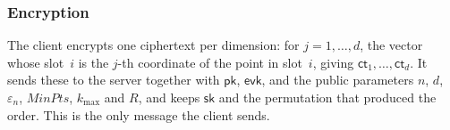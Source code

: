 

\subsubsection{Encryption}
The client encrypts one ciphertext per dimension: for
$j = 1, \dots, d$, the vector whose slot~$i$ is the $j$-th coordinate of
the point in slot~$i$, giving $\mathsf{ct}_1, \dots, \mathsf{ct}_d$. It
sends these to the server together with $\mathsf{pk}$, $\mathsf{evk}$,
and the public parameters $n$, $d$, $\varepsilon_n$, $\mathit{MinPts}$,
$k_{\max}$ and $R$, and keeps $\mathsf{sk}$ and the permutation that
produced the order. This is the only message the client sends.

